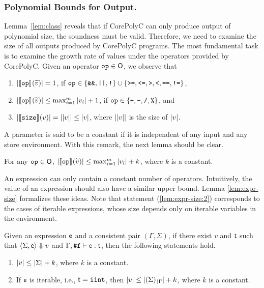 \documentclass[runningheads]{llncs}
\begin{document}
\subsubsection{Polynomial Bounds for Output.}\label{sec-variable-size}
Lemma~\ref{lem:class} reveals that if CorePolyC can only produce output of polynomial size, the soundness must be valid.
Therefore, we need to examine the size of all outputs produced by CorePolyC programs.
The most fundamental task is to examine the growth rate of values under the operators provided by CorePolyC.
Given an operator $\op\in\O$, we observe that
\begin{enumerate}
    \item $\size{\smap{\op}{}(\widetilde{v})}=1$, if $\op\in\{\texttt{\&\&},\texttt{||},\texttt{!}\}\cup\{\texttt{>=},\texttt{<=},\texttt{>},\texttt{<},\texttt{==},\texttt{!=}\}$,
    \item $\size{\smap{\op}{}(\widetilde{v})}\le \max_{i=1}^{m} \size{v_i}+1$, if $\op\in\{\texttt{+},\texttt{-},\texttt{/},\texttt{\%}\}$, and
    \item $\size{\smap{\opSize}{}{(v)}}=\size{\size{v}}\le\size{v}$, where $\size{\size{v}}$ is the size of $\size{v}$.
\end{enumerate}
A parameter is said to be a constant if it is independent of any input and any store environment.
With this remark, the next lemma should be clear.
\begin{lemma}
\label{lem:op-size}
For any $\op\in\O$, $\size{\smap{\op}{}(\widetilde{v})}\le\max_{i=1}^{m} \size{v_i}+k$, where $k$ is a constant.
\end{lemma}

An expression can only contain a constant number of operators.
Intuitively, the value of an expression should also have a similar upper bound.
Lemma \ref{lem:expr-size} formalizes these ideas.
Note that statement (\ref{lem:expr-size:2}) corresponds to the cases of iterable expressions, whose size depends only on iterable variables in the environment.

\begin{lemma}
\label{lem:expr-size}

Given an expression $\e$ and a consistent pair $(\Gamma,\Sigma)$, if there exist $v$ and $\tt$ such that $\semantics{\Sigma}{\e}{v}$ and $\typing{\Gamma}{\f}{\e}{\tt}$, then the following statements hold.
\begin{enumerate}
    \item $\size{v}\le\size{\Sigma}+k$, where $k$ is a constant.
    \item\label{lem:expr-size:2} If $\e$ is iterable, i.e., $\tt=\typeIterInt$, then $\size{v}\le\size{\restr{\Sigma}{\Gamma}}+k$, where $k$ is a constant.
\end{enumerate}
\end{lemma}
\end{document}
